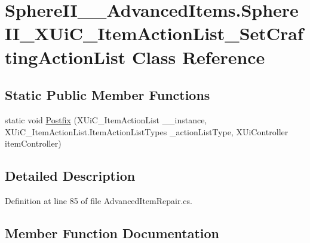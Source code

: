 \hypertarget{class_sphere_i_i_____advanced_items_1_1_sphere_i_i___x_ui_c___item_action_list___set_crafting_action_list}{}\section{Sphere\+I\+I\+\_\+\+\_\+\+Advanced\+Items.\+Sphere\+I\+I\+\_\+\+X\+Ui\+C\+\_\+\+Item\+Action\+List\+\_\+\+Set\+Crafting\+Action\+List Class Reference}
\label{class_sphere_i_i_____advanced_items_1_1_sphere_i_i___x_ui_c___item_action_list___set_crafting_action_list}
\subsection*{Static Public Member Functions}
\begin{DoxyCompactItemize}
\item 
static void \mbox{\hyperlink{class_sphere_i_i_____advanced_items_1_1_sphere_i_i___x_ui_c___item_action_list___set_crafting_action_list_afded9fc3e00f1687050c737de1369d0f}{Postfix}} (X\+Ui\+C\+\_\+\+Item\+Action\+List \+\_\+\+\_\+instance, X\+Ui\+C\+\_\+\+Item\+Action\+List.\+Item\+Action\+List\+Types \+\_\+action\+List\+Type, X\+Ui\+Controller item\+Controller)
\end{DoxyCompactItemize}


\subsection{Detailed Description}


Definition at line 85 of file Advanced\+Item\+Repair.\+cs.



\subsection{Member Function Documentation}
\mbox{\label{class_sphere_i_i_____advanced_items_1_1_sphere_i_i___x_ui_c___item_action_list___set_crafting_action_list_afded9fc3e00f1687050c737de1369d0f}} 
